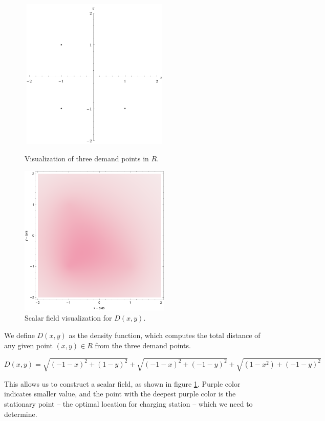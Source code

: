\documentclass[10pt]{article}
\begin{document}
\begin{figure}[htbp]
    \centering
    \begin{minipage}[t]{0.45\textwidth}
        \centering
        \includegraphics[width=205pt,height=205pt]{dot_plot.pdf}
        \caption{\small Visualization of three demand points in $R$.}
    \end{minipage}
    \begin{minipage}[t]{0.45\textwidth}
        \centering
        \includegraphics[width=205pt,height=205pt]{density_plot.pdf}
        \caption{\small Scalar field visualization for $D(x,y).$}
    \end{minipage}
    \label{fig:density_plot}
\end{figure}

We define $D(x,y)$ as the density function, which computes the total distance of any given point $(x,y) \in R$ from the three demand points.

\begin{equation}
    D(x,y) = \sqrt{(-1-x)^2+(1-y)^2} + \sqrt{(-1-x)^2+(-1-y)^2} + \sqrt{(1-x^2)+(-1-y)^2}
\end{equation}

This allows us to construct a scalar field, as shown in figure \ref{fig:density_plot}. Purple color indicates smaller value, and the point with the deepest purple color is the stationary point – the optimal location for charging station – which we need to determine.
\end{document}
